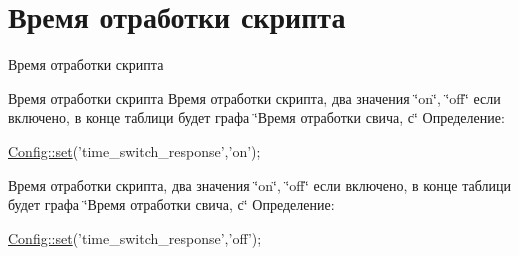 \hypertarget{group__code__time}{\section{Время отработки скрипта}
\label{group__code__time}
}


Время отработки скрипта  


Время отработки скрипта Время отработки скрипта, два значения \char`\"{}on\char`\"{}, \char`\"{}off\char`\"{} если включено, в конце таблици будет графа \char`\"{}Время отработки свича, с\char`\"{} Определение\-: 
\begin{DoxyCode}
\hyperlink{class_config_aa485369b2925858d92e468d405bd0798}{Config::set}(\textcolor{stringliteral}{'time\_switch\_response'},\textcolor{stringliteral}{'on'});
\end{DoxyCode}


Время отработки скрипта, два значения \char`\"{}on\char`\"{}, \char`\"{}off\char`\"{} если включено, в конце таблици будет графа \char`\"{}Время отработки свича, с\char`\"{} Определение\-: 
\begin{DoxyCode}
\hyperlink{class_config_aa485369b2925858d92e468d405bd0798}{Config::set}(\textcolor{stringliteral}{'time\_switch\_response'},\textcolor{stringliteral}{'off'});
\end{DoxyCode}
 